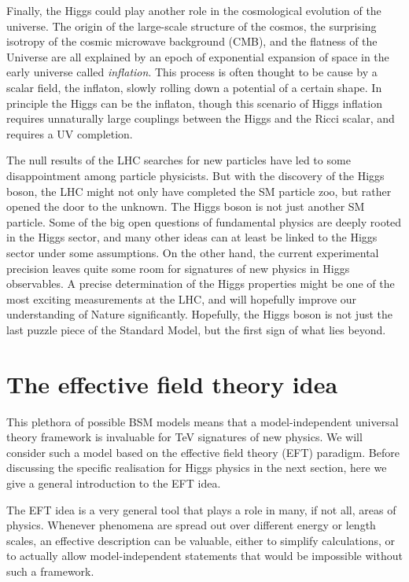 Finally, the Higgs could play another role in the cosmological
evolution of the universe. The origin of the large-scale structure of
the cosmos, the surprising isotropy of the cosmic microwave background
(CMB), and the flatness of the Universe are all explained by an epoch
of exponential expansion of space in the early universe called
\emph{inflation}. This process is often thought to be cause by a
scalar field, the inflaton, slowly rolling down a potential of a
certain shape. In principle the Higgs can be the inflaton, though this
scenario of Higgs inflation requires unnaturally large couplings
between the Higgs and the Ricci scalar, and requires a UV completion.

\newparagraph
%
The null results of the LHC searches for new particles have led to
some disappointment among particle physicists. But with the discovery
of the Higgs boson, the LHC might not only have completed the SM
particle zoo, but rather opened the door to the unknown.  The Higgs
boson is not just another SM particle.  Some of the big open questions
of fundamental physics are deeply rooted in the Higgs sector, and many
other ideas can at least be linked to the Higgs sector under some
assumptions. On the other hand, the current experimental precision
leaves quite some room for signatures of new physics in Higgs
observables. A precise determination of the Higgs properties might be
one of the most exciting measurements at the LHC, and will hopefully
improve our understanding of Nature significantly. Hopefully, the
Higgs boson is not just the last puzzle piece of the Standard Model,
but the first sign of what lies beyond.



\section{The effective field theory idea}
\label{sec:foundations_eft}

This plethora of possible BSM models means that a model-independent
universal theory framework is invaluable for TeV signatures of new
physics. We will consider such a model based on the effective field
theory (EFT) paradigm. Before discussing the specific realisation for
Higgs physics in the next section, here we give a general introduction
to the EFT idea.

The EFT idea is a very general tool that plays a role in many, if not
all, areas of physics. Whenever phenomena are spread out over
different energy or length scales, an effective description can be
valuable, either to simplify calculations, or to actually allow
model-independent statements that would be impossible without such a
framework.



